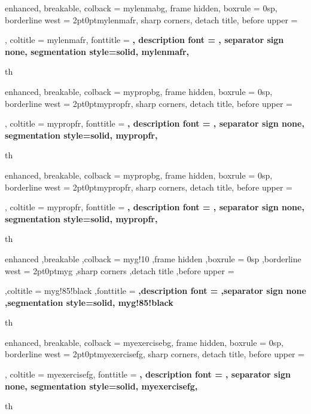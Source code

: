 {%
  enhanced,
  breakable,
  colback = mylenmabg,
  frame hidden,
  boxrule = 0sp,
  borderline west = {2pt}{0pt}{mylenmafr},
  sharp corners,
  detach title,
  before upper = \tcbtitle\par\smallskip,
  coltitle = mylenmafr,
  fonttitle = \bfseries\sffamily,
  description font = \mdseries,
  separator sign none,
  segmentation style={solid, mylenmafr},
}
{th}



{%
  enhanced,
  breakable,
  colback = mypropbg,
  frame hidden,
  boxrule = 0sp,
  borderline west = {2pt}{0pt}{mypropfr},
  sharp corners,
  detach title,
  before upper = \tcbtitle\par\smallskip,
  coltitle = mypropfr,
  fonttitle = \bfseries\sffamily,
  description font = \mdseries,
  separator sign none,
  segmentation style={solid, mypropfr},
}
{th}

{%
  enhanced,
  breakable,
  colback = mypropbg,
  frame hidden,
  boxrule = 0sp,
  borderline west = {2pt}{0pt}{mypropfr},
  sharp corners,
  detach title,
  before upper = \tcbtitle\par\smallskip,
  coltitle = mypropfr,
  fonttitle = \bfseries\sffamily,
  description font = \mdseries,
  separator sign none,
  segmentation style={solid, mypropfr},
}
{th}



{%
  enhanced
  ,breakable
  ,colback = myg!10
  ,frame hidden
  ,boxrule = 0sp
  ,borderline west = {2pt}{0pt}{myg}
  ,sharp corners
  ,detach title
  ,before upper = \tcbtitle\par\smallskip
  ,coltitle = myg!85!black
  ,fonttitle = \bfseries\sffamily
  ,description font = \mdseries
  ,separator sign none
  ,segmentation style={solid, myg!85!black}
}
{th}




{%
  enhanced,
  breakable,
  colback = myexercisebg,
  frame hidden,
  boxrule = 0sp,
  borderline west = {2pt}{0pt}{myexercisefg},
  sharp corners,
  detach title,
  before upper = \tcbtitle\par\smallskip,
  coltitle = myexercisefg,
  fonttitle = \bfseries\sffamily,
  description font = \mdseries,
  separator sign none,
  segmentation style={solid, myexercisefg},
}
{th}

